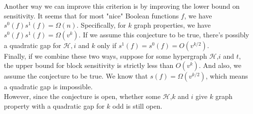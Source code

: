 \documentclass[psamsfonts]{amsart}
\theoremstyle{definition}
\theoremstyle{remark}
\numberwithin{equation}{section}
\begin{document}
		\indent Another way we can improve this criterion is by improving the lower bound on sensitivity. It seems that for most "nice" Boolean functions $f$, we have $s^0(f)s^1(f) = \Omega(n)$. Specifically, for $k$ graph properties, we have $s^0(f)s^1(f) = \Omega(v^k)$. If we assume this conjecture to be true, there's possibly a quadratic gap for $\mathcal{H},i$ and $k$ only if $s^1(f) = s^0(f) = O(v^{k/2})$.\\
		\indent Finally, if we combine these two ways, suppose for some hypergraph $\mathcal{H}$,$i$ and $t$, the upper bound for block sensitivity is strictly less than $O(v^k)$. And also, we assume the conjecture to be true. We know that $s(f) = \Omega(v^{k/2})$, which means a quadratic gap is impossible.\\
		\indent However, since the conjecture is open, whether some $\mathcal{H}$,$k$ and $i$ give $k$ graph property with a quadratic gap for $k$ odd is still open.
\end{document}
